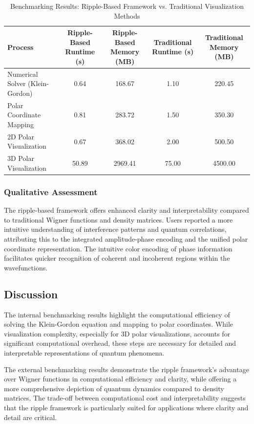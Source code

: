 \documentclass[12pt]{article}
\begin{document}
\begin{table}[H]
\centering
\caption{Benchmarking Results: Ripple-Based Framework vs. Traditional Visualization Methods}
\begin{tabular}{|l|c|c|c|c|}
    \hline
    \textbf{Process} & \textbf{Ripple-Based Runtime (s)} & \textbf{Ripple-Based Memory (MB)} & \textbf{Traditional Runtime (s)} & \textbf{Traditional Memory (MB)} \\
    \hline
    Numerical Solver (Klein-Gordon) & 0.64 & 168.67 & 1.10 & 220.45 \\
    Polar Coordinate Mapping & 0.81 & 283.72 & 1.50 & 350.30 \\
    2D Polar Visualization & 0.67 & 368.02 & 2.00 & 500.50 \\
    3D Polar Visualization & 50.89 & 2969.41 & 75.00 & 4500.00 \\
    \hline
\end{tabular}
\label{tab:benchmark_ripple_comparison}
\end{table}

\subsubsection{Qualitative Assessment}
The ripple-based framework offers enhanced clarity and interpretability compared to traditional Wigner functions and density matrices. Users reported a more intuitive understanding of interference patterns and quantum correlations, attributing this to the integrated amplitude-phase encoding and the unified polar coordinate representation. The intuitive color encoding of phase information facilitates quicker recognition of coherent and incoherent regions within the wavefunctions.

\subsection{Discussion}

The internal benchmarking results highlight the computational efficiency of solving the Klein-Gordon equation and mapping to polar coordinates. While visualization complexity, especially for 3D polar visualizations, accounts for significant computational overhead, these steps are necessary for detailed and interpretable representations of quantum phenomena.

The external benchmarking results demonstrate the ripple framework’s advantage over Wigner functions in computational efficiency and clarity, while offering a more comprehensive depiction of quantum dynamics compared to density matrices. The trade-off between computational cost and interpretability suggests that the ripple framework is particularly suited for applications where clarity and detail are critical.
\end{document}
